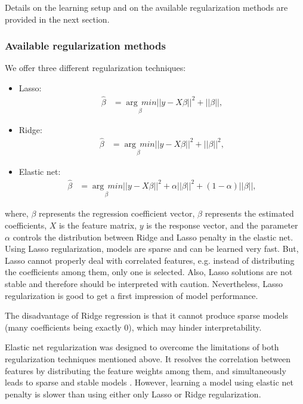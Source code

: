 \documentclass{article}
\begin{document}
Details on the learning setup and on the available regularization methods are provided in the next section.

\subsubsection{Available regularization methods}
We offer three different regularization techniques:
\begin{itemize}
\item Lasso:
\begin{align}
 \hat{\beta}&=\underset{\beta}{\arg\,min} ||y-X\beta||^2 + ||\beta||,
\end{align}
\item Ridge:
\begin{align}
 \hat{\beta}&=\underset{\beta}{\arg\,min} ||y-X\beta||^2 + ||\beta||^2,
\end{align}
\item Elastic net:
\begin{align}
 \hat{\beta}&=\underset{\beta}{\arg\,min} ||y-X\beta||^2 + \alpha||\beta||^2 + (1-\alpha)||\beta||,
\end{align}
\end{itemize}
where, $\beta$ represents the regression coefficient vector, $\hat{\beta}$ represents the estimated coefficients, $X$ is the feature matrix, $y$ is the response vector, and
the parameter $\alpha$ controls the distribution between Ridge and Lasso penalty in the elastic net.
\bigskip
\\Using Lasso regularization, models are sparse and can be learned very fast. 
But, Lasso cannot properly deal with correlated features, e.g. instead of distributing the coefficients among them, only one is selected. Also, Lasso solutions are not stable and therefore should be interpreted with caution. Nevertheless, Lasso regularization is good to get a first impression of model performance. 

The disadvantage of Ridge regression is that it cannot produce sparse models (many coefficients being exactly 0), which may hinder interpretability. 

Elastic net regularization was designed to overcome the limitations of both regularization techniques mentioned above.
It resolves the correlation between features by distributing the feature weights among them, and simultaneously leads to sparse and stable models \cite{Zou05regularizationand}. 
However, learning a model using elastic net penalty is slower than using either only Lasso or Ridge regularization.
\end{document}
